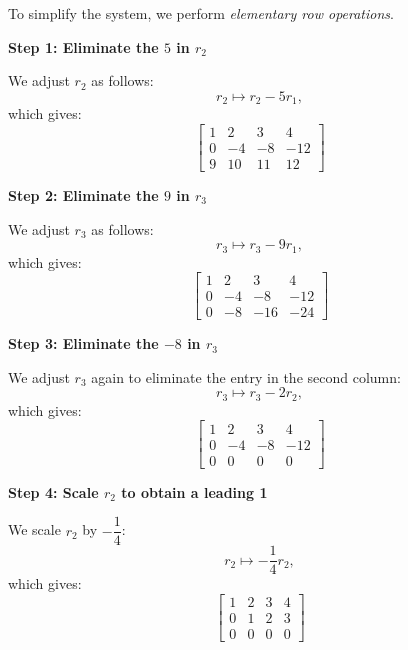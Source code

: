 \begin{solution} To simplify the system, we perform \textit{elementary row operations}.
        
    \textbf{Step 1: Eliminate the \( 5 \) in \( r_2 \)}
        
        We adjust \( r_2 \) as follows:
        \[
        r_2 \mapsto r_2 - 5r_1,
        \]
        which gives:
        \[
        \left[\begin{array}{cccc}
        1 & 2 & 3 & 4 \\
        0 & -4 & -8 & -12 \\
        9 & 10 & 11 & 12
        \end{array}\right]
        \]
        
    \textbf{Step 2: Eliminate the \( 9 \) in \( r_3 \)}
        
        We adjust \( r_3 \) as follows:
        \[
        r_3 \mapsto r_3 - 9r_1,
        \]
        which gives:
        \[
        \left[\begin{array}{ccc|c}
        1 & 2 & 3 & 4 \\
        0 & -4 & -8 & -12 \\
        0 & -8 & -16 & -24
        \end{array}\right]
        \]
        
    \textbf{Step 3: Eliminate the \( -8 \) in \( r_3 \)}
        
        We adjust \( r_3 \) again to eliminate the entry in the second column:
        \[
        r_3 \mapsto r_3 - 2r_2,
        \]
        which gives:
        \[
        \left[\begin{array}{cccc}
        1 & 2 & 3 & 4 \\
        0 & -4 & -8 & -12 \\
        0 & 0 & 0 & 0
        \end{array}\right]
        \]
        
    \newpage

    \textbf{Step 4: Scale \( r_2 \) to obtain a leading 1}
        
        We scale \( r_2 \) by \( -\dfrac{1}{4} \):
        \[
        r_2 \mapsto -\dfrac{1}{4} r_2,
        \]
        which gives:
        \[
        \left[\begin{array}{ccc|c}
        1 & 2 & 3 & 4 \\
        0 & 1 & 2 & 3 \\
        0 & 0 & 0 & 0
        \end{array}\right]
        \]
        

\end{solution}
